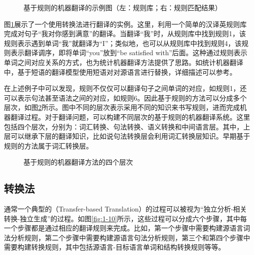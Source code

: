 \begin{figure}[htp]
    \centering

    \caption{基于规则的机器翻译的示例图（左：规则库；右：规则匹配结果）}
    \label{fig:1-8}
\end{figure}

\parinterval 图\ref{fig:1-8}展示了一个使用转换法进行翻译的实例。这里，利用一个简单的汉译英规则库完成对句子“我对你感到满意”的翻译。当翻译“我”时，从规则库中找到规则1，该规则表示遇到单词“我”就翻译为“I”；类似地，也可以从规则库中找到规则4，该规则表示翻译调序，即将单词“you”放到“be satisfied with”后面。这种通过规则表示单词之间对应关系的方式，也为统计机器翻译方法提供了思路。如统计机器翻译中，基于短语的翻译模型使用短语对对源语言进行替换，详细描述可以参考{\chapterseven}。

\parinterval 在上述例子中可以发现，规则不仅仅可以翻译句子之间单词的对应，如规则1，还可以表示句法甚至语法之间的对应，如规则6。因此基于规则的方法可以分成多个层次，如图\ref{fig:1-9}所示。图中不同的层次表示采用不同的知识来书写规则，进而完成机器翻译过程。对于翻译问题，可以构建不同层次的基于规则的机器翻译系统。这里包括四个层次，分别为：词汇转换、句法转换、语义转换和中间语言层。其中，上层可以继承下层的翻译知识，比如说句法转换层会利用词汇转换层知识。早期基于规则的方法属于词汇转换层。

\begin{figure}[htp]
    \centering

    \caption{基于规则的机器翻译方法的四个层次}
\setlength{\belowcaptionskip}{-1.5em}
    \label{fig:1-9}
\end{figure}


\subsection{转换法}

\parinterval 通常一个典型的{\small{}}（Transfer-based Translation）的过程可以被视为“独立分析-相关转换-独立生成”的过程。如图\ref{fig:1-10}所示，这些过程可以分成六个步骤，其中每一个步骤都是通过相应的翻译规则来完成。比如，第一个步骤中需要构建源语言词法分析规则，第二个步骤中需要构建源语言句法分析规则，第三个和第四个步骤中需要构建转换规则，其中包括源语言-目标语言单词和结构转换规则等等。


